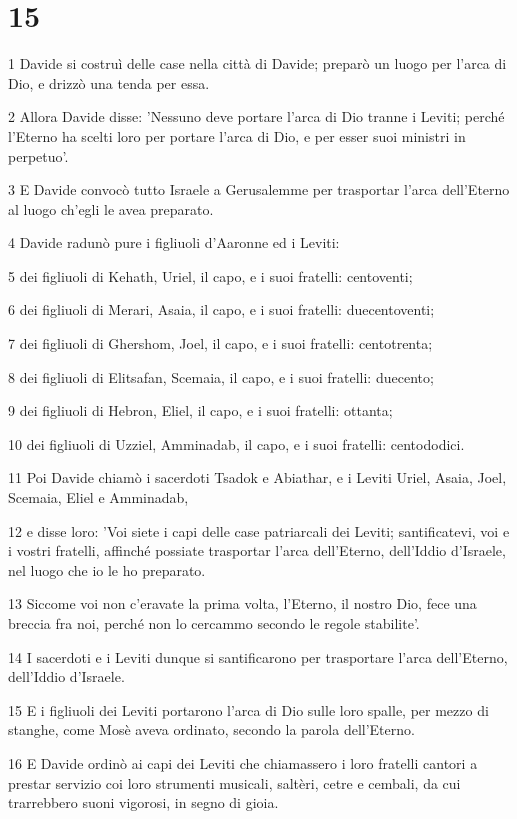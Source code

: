 \chapter{15}

\par 1 Davide si costruì delle case nella città di Davide; preparò un luogo per l'arca di Dio, e drizzò una tenda per essa.
\par 2 Allora Davide disse: 'Nessuno deve portare l'arca di Dio tranne i Leviti; perché l'Eterno ha scelti loro per portare l'arca di Dio, e per esser suoi ministri in perpetuo'.
\par 3 E Davide convocò tutto Israele a Gerusalemme per trasportar l'arca dell'Eterno al luogo ch'egli le avea preparato.
\par 4 Davide radunò pure i figliuoli d'Aaronne ed i Leviti:
\par 5 dei figliuoli di Kehath, Uriel, il capo, e i suoi fratelli: centoventi;
\par 6 dei figliuoli di Merari, Asaia, il capo, e i suoi fratelli: duecentoventi;
\par 7 dei figliuoli di Ghershom, Joel, il capo, e i suoi fratelli: centotrenta;
\par 8 dei figliuoli di Elitsafan, Scemaia, il capo, e i suoi fratelli: duecento;
\par 9 dei figliuoli di Hebron, Eliel, il capo, e i suoi fratelli: ottanta;
\par 10 dei figliuoli di Uzziel, Amminadab, il capo, e i suoi fratelli: centododici.
\par 11 Poi Davide chiamò i sacerdoti Tsadok e Abiathar, e i Leviti Uriel, Asaia, Joel, Scemaia, Eliel e Amminadab,
\par 12 e disse loro: 'Voi siete i capi delle case patriarcali dei Leviti; santificatevi, voi e i vostri fratelli, affinché possiate trasportar l'arca dell'Eterno, dell'Iddio d'Israele, nel luogo che io le ho preparato.
\par 13 Siccome voi non c'eravate la prima volta, l'Eterno, il nostro Dio, fece una breccia fra noi, perché non lo cercammo secondo le regole stabilite'.
\par 14 I sacerdoti e i Leviti dunque si santificarono per trasportare l'arca dell'Eterno, dell'Iddio d'Israele.
\par 15 E i figliuoli dei Leviti portarono l'arca di Dio sulle loro spalle, per mezzo di stanghe, come Mosè aveva ordinato, secondo la parola dell'Eterno.
\par 16 E Davide ordinò ai capi dei Leviti che chiamassero i loro fratelli cantori a prestar servizio coi loro strumenti musicali, saltèri, cetre e cembali, da cui trarrebbero suoni vigorosi, in segno di gioia.
